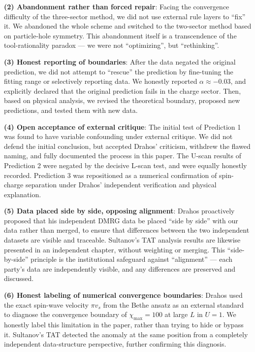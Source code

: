 \documentclass[prb,reprint,twocolumn,superscriptaddress]{revtex4-2}
\begin{document}
\textbf{(2) Abandonment rather than forced repair}: Facing the convergence difficulty of the three-sector method, we did not use external rule layers to ``fix'' it. We abandoned the whole scheme and switched to the two-sector method based on particle-hole symmetry. This abandonment itself is a transcendence of the tool-rationality paradox --- we were not ``optimizing'', but ``rethinking''.

\textbf{(3) Honest reporting of boundaries}: After the data negated the original prediction, we did not attempt to ``rescue'' the prediction by fine-tuning the fitting range or selectively reporting data. We honestly reported $\alpha \approx -0.03$, and explicitly declared that the original prediction fails in the charge sector. Then, based on physical analysis, we revised the theoretical boundary, proposed new predictions, and tested them with new data.

\textbf{(4) Open acceptance of external critique}: The initial test of Prediction 1 was found to have variable confounding under external critique. We did not defend the initial conclusion, but accepted Drahos' criticism, withdrew the flawed naming, and fully documented the process in this paper. The U-scan results of Prediction 2 were negated by the decisive L-scan test, and were equally honestly recorded. Prediction 3 was repositioned as a numerical confirmation of spin-charge separation under Drahos' independent verification and physical explanation.

\textbf{(5) Data placed side by side, opposing alignment}: Drahos proactively proposed that his independent DMRG data be placed ``side by side'' with our data rather than merged, to ensure that differences between the two independent datasets are visible and traceable. Sultanov's TAT analysis results are likewise presented in an independent chapter, without weighting or merging. This ``side-by-side'' principle is the institutional safeguard against ``alignment'' --- each party's data are independently visible, and any differences are preserved and discussed.

\textbf{(6) Honest labeling of numerical convergence boundaries}: Drahos used the exact spin-wave velocity $\pi v_s$ from the Bethe ansatz as an external standard to diagnose the convergence boundary of $\chi_{\max}=100$ at large $L$ in $U=1$. We honestly label this limitation in the paper, rather than trying to hide or bypass it. Sultanov's TAT detected the anomaly at the same position from a completely independent data-structure perspective, further confirming this diagnosis.
\end{document}

